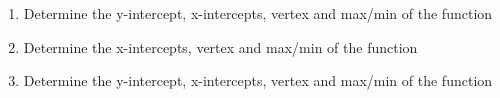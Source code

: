 \documentclass{article}
\begin{document}
\begin{minipage}[c]{0.45\textwidth}
    \vspace{-4cm}
    \begin{enumerate}
        
        \item Determine the y-intercept,
        x-intercepts, vertex and max/min of the function
        \vspace{5cm}

        \item Determine the
        x-intercepts, vertex and max/min of the function
        \vspace{5cm}

        \item Determine the y-intercept,
        x-intercepts, vertex and max/min of the function   


    \end{enumerate}
\end{minipage}%
\hfill
\end{document}
